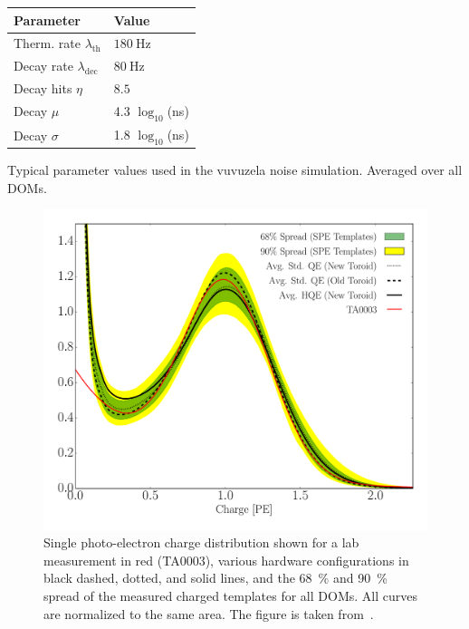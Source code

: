 \begin{margintable}
\small
    \begin{tabular}{ ll }
    \hline\hline

    \textbf{Parameter} & \textbf{Value} \\ 

    \hline\hline

    Therm. rate $\lambda_\mathrm{th}$ & $\SI{180}{\hertz}$ \\
    Decay rate $\lambda_\mathrm{dec}$ & $\SI{80}{\hertz}$ \\
    Decay hits $\eta$ &  $8.5$ \\
    Decay $\mu$ & 4.3 $\log_{10}$(\si{\nano\second}) \\
    Decay $\sigma$ & 1.8 $\log_{10}$(\si{\nano\second}) \\

    \hline
    \end{tabular}
\caption[Vuvuzela noise simulation parameters]{Typical parameter values used in the vuvuzela noise simulation. Averaged over all DOMs.}
\end{margintable}

\begin{figure}[h]
    \includegraphics[width=.9\textwidth]{figures/simulation_and_processing/SPE_TA003_2.pdf}
	\caption[Single photo-electron charge distribution]{Single photo-electron charge distribution shown for a lab measurement in red (TA0003), various hardware configurations in black dashed, dotted, and solid lines, and the \SI{68}{\percent} and \SI{90}{\percent} spread of the measured charged templates for all DOMs. All curves are normalized to the same area. The figure is taken from~\cite{spe_respose_pmt}.}
\end{figure}

